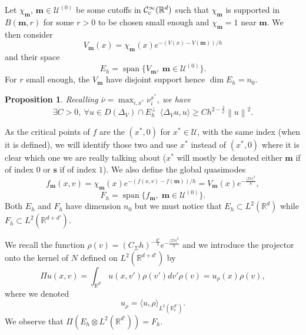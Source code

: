 \documentclass[12pt]{amsart}
\renewcommand{\span}{\operatorname{span}}
\newcommand{\R}{\mathbb R}
\def\<{\langle}
\def\>{\rangle}
\numberwithin{equation}{section}
\numberwithin{figure}{section}
\def\m{\mathbf{m}}
\def\s{\mathbf{s}}
\newcommand{\vvert}[1]{\left\lVert#1\right\rVert}
\newtheorem{proposition}[defin]{Proposition}
\def\uuu{{\mathcal U}}\def\vvv{{\mathcal V}}\def\www{{\mathcal W}}\def\xxx{{\mathcal X}}
\begin{document}
Let $\chi_\m$, $\m\in \uuu^{(0)}$ be some cutoffs in $\ccc_c^\infty(\R^d)$ such that $\chi_\m$ is supported in $B(\m,r)$ for some $r>0$ to be chosen small enough and $\chi_\m=1$ near $\m$. We then consider
\begin{equation*}
V_\m(x) = \chi_\m(x) e^{-(V(x) - V(\m))/h}
\end{equation*}
and their space
\begin{equation*}
E_h = \span\{V_\m,\ \m\in\uuu^{(0)}\}.
\end{equation*}
For $r$ small enough, the $V_\m$ have disjoint support hence $\dim E_h = n_0$.

\begin{proposition}\label{prop:gapWitten}\cite[Proposition 2.1]{De25_1}
    Recalling $\overline{\nu}=\max_{i,x^*}\nu_i^{x^*}$, we have
    \begin{equation*}
    \exists C>0,\ \forall u\in D(\Delta_V)\cap E_h^\bot\ \ \<\Delta_Vu,u\> \geq Ch^{2-\frac2{\overline{\nu}}}\vvert{u}^2.
    \end{equation*}
\end{proposition}

As the critical points of $f$ are the $(x^*,0)$ for $x^*\in\uuu$, with the same index (when it is defined), we will identify those two and use $x^*$ instead of $(x^*,0)$ where it is clear which one we are really talking about ($x^*$ will mostly be denoted either $\m$ if of index $0$ or $\s$ if of index $1$). We also define the global quasimodes
\begin{equation*}
f_\m(x,v)=\chi_\m(x) e^{-(f(x,v)-f(\m))/h} = V_\m(x)e^{-\frac{|\Sigma v|^2}{h}},
\end{equation*}
\begin{equation*}
F_h=\span\{f_\m,\;\m\in\uuu^{(0)}\}.
\end{equation*}
Both $E_h$ and $F_h$ have dimension $n_0$ but we must notice that $E_h\subset L^2(\R^d)$ while $F_h\subset L^2(\R^{d+d'})$.

We recall the function $\rho(v)=(C_\Sigma h)^{-\frac {d'}4}e^{-\frac{|\Sigma v|^2}{h}}$ and we introduce the projector onto the kernel of $N$ defined on $L^2(\R^{d+d'})$ by
\begin{equation*}
\Pi u(x,v)=\int_{\R^{d'}}u(x,v')\rho(v')dv' \rho(v)=u_\rho(x)\rho(v),
\end{equation*}
where we denoted
\begin{equation}\label{eq:rho}
u_\rho = \< u, \rho\>_{L^2(\R_v^{d'})}.
\end{equation}
We observe that $\Pi (E_h\otimes L^2(\R^{d'})) = F_h$.
\end{document}
